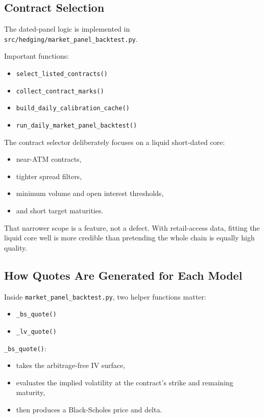 \documentclass[11pt]{article}
\begin{document}
\subsection{Contract Selection}

The dated-panel logic is implemented in
\texttt{src/hedging/market\_panel\_backtest.py}.

Important functions:

\begin{itemize}
  \item \texttt{select\_listed\_contracts()}
  \item \texttt{collect\_contract\_marks()}
  \item \texttt{build\_daily\_calibration\_cache()}
  \item \texttt{run\_daily\_market\_panel\_backtest()}
\end{itemize}

The contract selector deliberately focuses on a liquid short-dated core:

\begin{itemize}
  \item near-ATM contracts,
  \item tighter spread filters,
  \item minimum volume and open interest thresholds,
  \item and short target maturities.
\end{itemize}

That narrower scope is a feature, not a defect. With retail-access data, fitting the liquid core well is more credible than pretending the whole chain is equally high quality.

\subsection{How Quotes Are Generated for Each Model}

Inside \texttt{market\_panel\_backtest.py}, two helper functions matter:

\begin{itemize}
  \item \texttt{\_bs\_quote()}
  \item \texttt{\_lv\_quote()}
\end{itemize}

\texttt{\_bs\_quote()}:

\begin{itemize}
  \item takes the arbitrage-free IV surface,
  \item evaluates the implied volatility at the contract's strike and remaining maturity,
  \item then produces a Black-Scholes price and delta.
\end{itemize}
\end{document}
